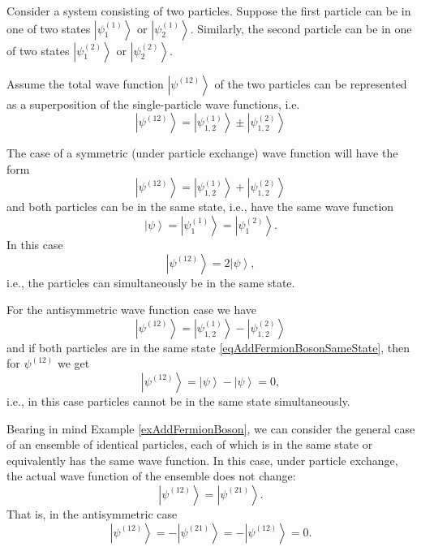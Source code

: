 \begin{example}
  Consider a system consisting of two particles. Suppose the first particle
  can be in one of two states $\left|\psi^{(1)}_1\right>$
  or $\left|\psi^{(1)}_2\right>$. Similarly, the second particle can
  be in one of two states $\left|\psi^{(2)}_1\right>$
  or $\left|\psi^{(2)}_2\right>$.

  Assume the total wave function $\left|\psi^{(12)}\right>$ of the two
  particles can be represented as a superposition of the single-particle wave functions, i.e. 
  \begin{equation}
    \left|\psi^{(12)}\right> = \left|\psi^{(1)}_{1,2}\right> \pm
    \left|\psi^{(2)}_{1,2}\right>
    \nonumber
  \end{equation}

  The case of a symmetric (under particle exchange) wave function will
  have the form
  \begin{equation}
    \left|\psi^{(12)}\right> = \left|\psi^{(1)}_{1,2}\right> +
    \left|\psi^{(2)}_{1,2}\right>
    \nonumber
  \end{equation}
  and both particles can be in the same state,
  i.e., have the same wave function
  \begin{equation}
  \left|\psi\right> = \left|\psi^{(1)}_{1}\right> =
  \left|\psi^{(2)}_{1}\right>.
  \label{eqAddFermionBosonSameState}
  \end{equation}
  In this case
  \[
  \left|\psi^{(12)}\right> = 2 \left|\psi\right>, 
  \]
  i.e., the particles can simultaneously be in the same
  state.

  For the antisymmetric wave function case we have
  \begin{equation}
    \left|\psi^{(12)}\right> = \left|\psi^{(1)}_{1,2}\right> -
    \left|\psi^{(2)}_{1,2}\right>
    \nonumber
  \end{equation}
  and if both particles are in the same state
  \eqref{eqAddFermionBosonSameState}, then for $\psi^{(12)}$ we get
  \[
  \left|\psi^{(12)}\right> = \left|\psi\right> - \left|\psi\right> = 0,
  \]
  i.e., in this case particles cannot be in the same
  state simultaneously.
  \label{exAddFermionBoson}
\end{example}
Bearing in mind Example \ref{exAddFermionBoson}, we can consider the general
case of an ensemble of identical particles, each of which is in
the same state or equivalently has the same wave function. In this case, under particle exchange, the actual wave
function of the ensemble does not change:
\[
\left|\psi^{(12)}\right> = \left|\psi^{(21)}\right>.
\]
That is, in the antisymmetric case
\[
\left|\psi^{(12)}\right> = - \left|\psi^{(21)}\right> =
-\left|\psi^{(12)}\right> = 0.
\] 

